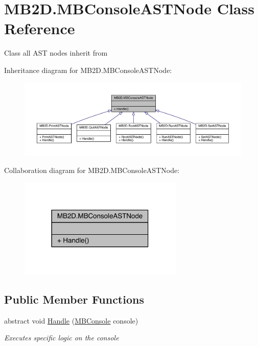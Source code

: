 \hypertarget{class_m_b2_d_1_1_m_b_console_a_s_t_node}{}\section{M\+B2\+D.\+M\+B\+Console\+A\+S\+T\+Node Class Reference}
\label{class_m_b2_d_1_1_m_b_console_a_s_t_node}


Class all A\+ST nodes inherit from  




Inheritance diagram for M\+B2\+D.\+M\+B\+Console\+A\+S\+T\+Node\+:
\nopagebreak
\begin{figure}[H]
\begin{center}
\leavevmode
\includegraphics[width=350pt]{class_m_b2_d_1_1_m_b_console_a_s_t_node__inherit__graph}
\end{center}
\end{figure}


Collaboration diagram for M\+B2\+D.\+M\+B\+Console\+A\+S\+T\+Node\+:
\nopagebreak
\begin{figure}[H]
\begin{center}
\leavevmode
\includegraphics[width=222pt]{class_m_b2_d_1_1_m_b_console_a_s_t_node__coll__graph}
\end{center}
\end{figure}
\subsection*{Public Member Functions}
\begin{DoxyCompactItemize}
\item 
abstract void \hyperlink{class_m_b2_d_1_1_m_b_console_a_s_t_node_aa70a49e61ab623698af4ed8fda4ebbf5}{Handle} (\hyperlink{class_m_b2_d_1_1_m_b_console}{M\+B\+Console} console)
\begin{DoxyCompactList}\small\item\em Executes specific logic on the console \end{DoxyCompactList}\end{DoxyCompactItemize}


